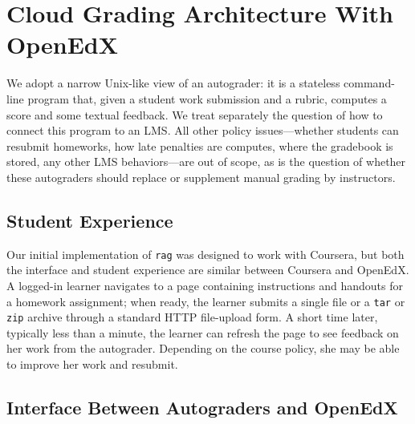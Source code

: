 \section{Cloud Grading Architecture With OpenEdX}
\label{sec:arch}

We adopt a narrow Unix-like view of an autograder: it is a
stateless command-line program that, given a student work submission and
a rubric, computes a score and some textual feedback.  We treat
separately the question of how to connect this program to an LMS.
All other policy issues---whether students can resubmit homeworks, how
late penalties are computes, where the gradebook is stored, any other
LMS behaviors---are out of scope, as is the question of whether these
autograders should replace or supplement manual grading by instructors.

\subsection{Student Experience}

Our initial implementation of \texttt{rag} was designed to work with
Coursera, but both the interface and student experience are similar
between Coursera and OpenEdX.  A logged-in learner navigates to a page
containing instructions and handouts for a homework assignment;
when ready, the learner submits a single file or a
\texttt{tar} or \texttt{zip} archive through a standard HTTP
file-upload form.  A short time later, typically less than a minute, the
learner can refresh the page to see feedback on her work from the
autograder.  Depending on the course policy, she may be able to improve
her work and resubmit.

\subsection{Interface Between Autograders and OpenEdX}

